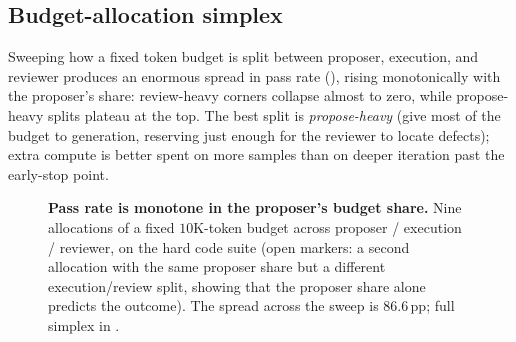 \subsection{Budget-allocation simplex}
Sweeping how a fixed token budget is split between proposer, execution, and reviewer produces an enormous spread in pass rate (), rising monotonically with the proposer's share: review-heavy corners collapse almost to zero, while propose-heavy splits plateau at the top. The best split is \emph{propose-heavy} (give most of the budget to generation, reserving just enough for the reviewer to locate defects); extra compute is better spent on more samples than on deeper iteration past the early-stop point.

\begin{figure}[H]
\centering
{}
\caption{\textbf{Pass rate is monotone in the proposer's budget share.} Nine allocations of a fixed $10$K-token budget across proposer / execution / reviewer, on the hard code suite (open markers: a second allocation with the same proposer share but a different execution/review split, showing that the proposer share alone predicts the outcome). The spread across the sweep is $86.6$\,pp; full simplex in .}
\label{fig:allocation}
\end{figure}

